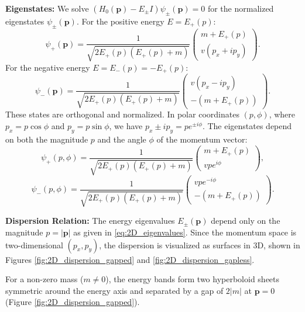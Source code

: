 \documentclass[11pt]{article}
\begin{document}
\textbf{Eigenstates:}
We solve $(H_0(\mathbf{p}) - E_{\pm} I) \psi_{\pm}(\mathbf{p}) = 0$ for the normalized eigenstates $\psi_{\pm}(\mathbf{p})$.
For the positive energy $E = E_+(p)$:
\begin{equation}
\psi_+(\mathbf{p}) = \frac{1}{\sqrt{2 E_+(p) (E_+(p) + m)}} \begin{pmatrix} m + E_+(p) \\ v(p_x + i p_y) \end{pmatrix}.
\label{eq:2D_eigenstate_plus}
\end{equation}
For the negative energy $E = E_-(p) = -E_+(p)$:
\begin{equation}
\psi_-(\mathbf{p}) = \frac{1}{\sqrt{2 E_+(p) (E_+(p) + m)}} \begin{pmatrix} v(p_x - i p_y) \\ -(m + E_+(p)) \end{pmatrix}.
\label{eq:2D_eigenstate_minus}
\end{equation}
These states are orthogonal and normalized. In polar coordinates $(p, \phi)$, where $p_x = p \cos \phi$ and $p_y = p \sin \phi$, we have $p_x \pm i p_y = p e^{\pm i \phi}$. The eigenstates depend on both the magnitude $p$ and the angle $\phi$ of the momentum vector:
\begin{equation}
\psi_+(p, \phi) = \frac{1}{\sqrt{2 E_+(p) (E_+(p) + m)}} \begin{pmatrix} m + E_+(p) \\ v p e^{i\phi} \end{pmatrix},
\end{equation}
\begin{equation}
\psi_-(p, \phi) = \frac{1}{\sqrt{2 E_+(p) (E_+(p) + m)}} \begin{pmatrix} v p e^{-i\phi} \\ -(m + E_+(p)) \end{pmatrix}.
\end{equation}

\textbf{Dispersion Relation:}
The energy eigenvalues $E_{\pm}(\mathbf{p})$ depend only on the magnitude $p=|\mathbf{p}|$ as given in \eqref{eq:2D_eigenvalues}. Since the momentum space is two-dimensional $(p_x, p_y)$, the dispersion is visualized as surfaces in 3D, shown in Figures \ref{fig:2D_dispersion_gapped} and \ref{fig:2D_dispersion_gapless}.

For a non-zero mass ($m \neq 0$), the energy bands form two hyperboloid sheets symmetric around the energy axis and separated by a gap of $2|m|$ at $\mathbf{p}=0$ (Figure \ref{fig:2D_dispersion_gapped}).
\end{document}
